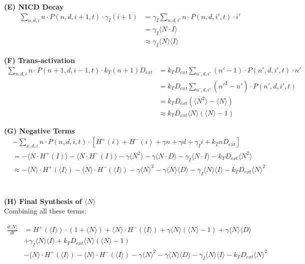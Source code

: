 \documentclass{article}
\begin{document}
\begin{flushleft}
\textbf{(E) NICD Decay}
\begin{align*}
\sum_{n,d,i} n \cdot P(n,d,i+1,t) \cdot \gamma_I(i+1) &= \gamma_I \sum_{n,d,i'} n \cdot P(n,d,i',t) \cdot i' \\
&= \gamma_I \langle N \cdot I \rangle \\
&\approx \gamma_I \langle N \rangle \langle I \rangle
\end{align*}

\textbf{(F) Trans-activation}
\begin{align*}
\sum_{n,d,i} n \cdot P(n+1,d,i-1,t) \cdot k_T(n+1)D_{ext} &= k_T D_{ext} \sum_{n',d,i'} (n'-1) \cdot P(n',d,i',t) \cdot n' \\
&= k_T D_{ext} \sum_{n',d,i'} (n'^2 - n') \cdot P(n',d,i',t) \\
&= k_T D_{ext} (\langle N^2 \rangle - \langle N \rangle) \\
&\approx k_T D_{ext} \langle N \rangle (\langle N \rangle - 1)
\end{align*}

\textbf{(G) Negative Terms}
\begin{align*}
&-\sum_{n,d,i} n \cdot P(n,d,i,t) \cdot [H^+(i) + H^-(i) + \gamma n + \gamma d + \gamma_I i + k_T n D_{ext}] \\
&= -\langle N \cdot H^+(I) \rangle - \langle N \cdot H^-(I) \rangle - \gamma \langle N^2 \rangle - \gamma \langle N \cdot D \rangle - \gamma_I \langle N \cdot I \rangle - k_T D_{ext} \langle N^2 \rangle \\
&\approx -\langle N \rangle \cdot H^+(\langle I \rangle) - \langle N \rangle \cdot H^-(\langle I \rangle) - \gamma \langle N \rangle^2 - \gamma \langle N \rangle \langle D \rangle - \gamma_I \langle N \rangle
\langle I \rangle - k_T D_{ext} \langle N \rangle^2
\end{align*} \\~\\

\textbf{(H) Final Synthesis of $\langle N \rangle$}\\

Combining all these terms:

\begin{align*}
\frac{d\langle N \rangle}{dt} &= H^+(\langle I \rangle) \cdot (1 + \langle N \rangle) + \langle N \rangle \cdot H^-(\langle I \rangle) + \gamma \langle N \rangle (\langle N \rangle - 1) + \gamma \langle N \rangle \langle D \rangle \\
&+ \gamma_I \langle N \rangle \langle I \rangle + k_T D_{ext} \langle N \rangle (\langle N \rangle - 1) \\
&- \langle N \rangle \cdot H^+(\langle I \rangle) - \langle N \rangle \cdot H^-(\langle I \rangle) - \gamma \langle N \rangle^2 - \gamma \langle N \rangle \langle D \rangle - \gamma_I \langle N \rangle \langle I \rangle - k_T D_{ext} \langle N \rangle^2 \\
\end{align*}


\end{flushleft}
\end{document}
